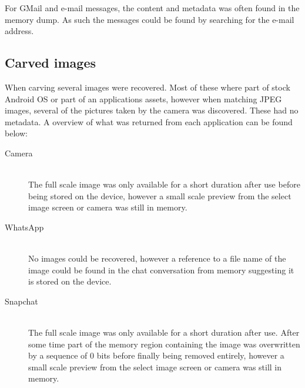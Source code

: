 For GMail and e-mail messages, the content and metadata was often found in the memory dump. As such the messages could be found by searching for the e-mail address.

\subsection{Carved images}
When carving several images were recovered. Most of these where part of stock Android OS or part of an applications assets, however when matching JPEG images, several of the pictures taken by the camera was discovered. These had no metadata. A overview of what was returned from each application can be found below:
\begin{description}
\item[Camera]\hfill\\
The full scale image was only available for a short duration after use before being stored on the device, however a small scale preview from the select image screen or camera was still in memory.
\item[WhatsApp]\hfill\\
No images could be recovered, however a reference to a file name of the image could be found in the chat conversation from memory suggesting it is stored on the device.
\item[Snapchat]\hfill\\
The full scale image was only available for a short duration after use. After some time part of the memory region containing the image was overwritten by a sequence of 0 bits before finally being removed entirely, however a small scale preview from the select image screen or camera was still in memory.
\end{description}